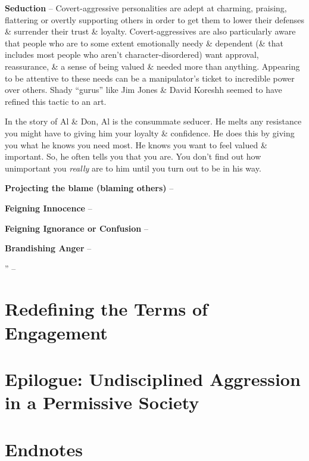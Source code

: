 \documentclass{article}
\numberwithin{equation}{section}
\begin{document}
\textbf{Seduction} -- Covert-aggressive personalities are adept at charming, praising, flattering or overtly supporting others in order to get them to lower their defenses \& surrender their trust \& loyalty. Covert-aggressives are also particularly aware that people who are to some extent emotionally needy \& dependent (\& that includes most people who aren't character-disordered) want approval, reassurance, \& a sense of being valued \& needed more than anything. Appearing to be attentive to these needs can be a manipulator's ticket to incredible power over others. Shady ``gurus'' like Jim Jones \& David Koreshh seemed to have refined this tactic to an art.

In the story of Al \& Don, Al is the consummate seducer. He melts any resistance you might have to giving him your loyalty \& confidence. He does this by giving you what he knows you need most. He knows you want to feel valued \& important. So, he often tells you that you are. You don't find out how unimportant you \textit{really} are to him until you turn out to be in his way.

\textbf{Projecting the blame (blaming others)} -- 

\textbf{Feigning Innocence} --

\textbf{Feigning Ignorance or Confusion} -- 

\textbf{Brandishing Anger} -- 

'' -- \cite[pp. 91--]{Simon2010}


\section{Redefining the Terms of Engagement}


\section{Epilogue: Undisciplined Aggression in a Permissive Society}


\section{Endnotes}


\printbibliography[heading=bibintoc]
	
\end{document}
